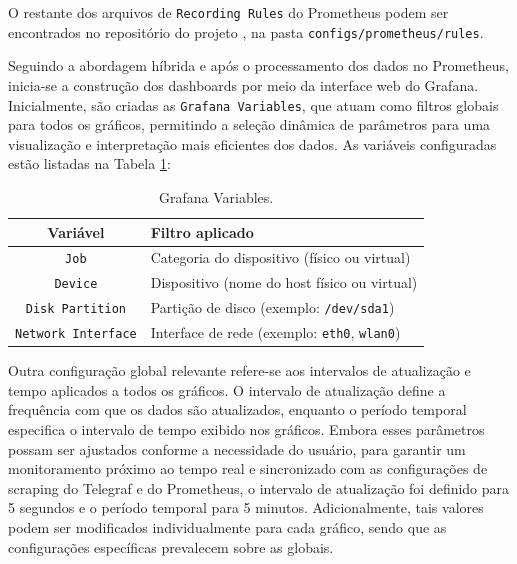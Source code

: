 O restante dos arquivos de \verb|Recording Rules| do Prometheus podem ser encontrados no repositório do projeto \citep{vitorcossetti2025}, na pasta \verb|configs/prometheus/rules|.

Seguindo a abordagem híbrida e após o processamento dos dados no Prometheus, inicia-se a construção dos dashboards por meio da interface web do Grafana. Inicialmente, são criadas as \verb|Grafana Variables|, que atuam como filtros globais para todos os gráficos, permitindo a seleção dinâmica de parâmetros para uma visualização e interpretação mais eficientes dos dados. As variáveis configuradas estão listadas na Tabela \ref{tab:grafana-variables}:

\begin{table}[H]
\centering
\caption{Grafana Variables.}
\label{tab:grafana-variables}
\begin{tabular}{cl}
\toprule
\textbf{Variável} & \textbf{Filtro aplicado} \\
\midrule
\verb|Job| & Categoria do dispositivo (físico ou virtual) \\
\verb|Device| & Dispositivo (nome do host físico ou virtual) \\
\verb|Disk Partition| & Partição de disco (exemplo: \verb|/dev/sda1|) \\
\verb|Network Interface| & Interface de rede (exemplo: \verb|eth0|, \verb|wlan0|) \\
\bottomrule
\end{tabular}
\end{table}

Outra configuração global relevante refere-se aos intervalos de atualização e tempo aplicados a todos os gráficos. O intervalo de atualização define a frequência com que os dados são atualizados, enquanto o período temporal especifica o intervalo de tempo exibido nos gráficos. Embora esses parâmetros possam ser ajustados conforme a necessidade do usuário, para garantir um monitoramento próximo ao tempo real e sincronizado com as configurações de scraping do Telegraf e do Prometheus, o intervalo de atualização foi definido para 5 segundos e o período temporal para 5 minutos. Adicionalmente, tais valores podem ser modificados individualmente para cada gráfico, sendo que as configurações específicas prevalecem sobre as globais.



